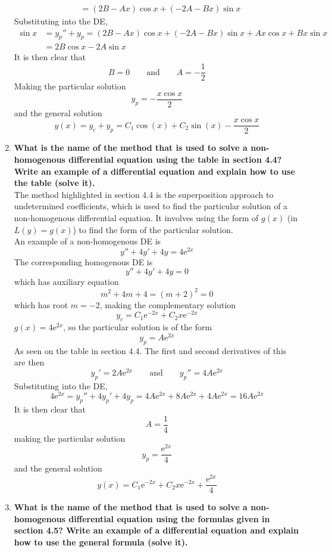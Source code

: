 \documentclass[12pt]{article}
\newcommand{\en}{\text{e}}
\begin{document}
\begin{enumerate}
\begin{align*}
						&= (2B - Ax)\cos x + (-2A - Bx)\sin x
				\end{align*}
				Substituting into the DE,
				\begin{align*}
					\sin x &= y_p'' + y_p
							= (2B - Ax)\cos x + (-2A - Bx)\sin x  + Ax\cos x + Bx \sin x \\
						&= 2B\cos x - 2A\sin x
				\end{align*}
				It is then clear that
				\[
					B = 0 \qquad \text{and} \qquad
						A = -\frac{1}{2}
				\]
				Making the particular solution
				\[y_p = -\frac{x\cos x}{2}\]
				and the general solution
				\[
					y(x) = y_c + y_p
						= C_1\cos(x) + C_2\sin(x) - \frac{x\cos x}{2}
				\]
		\item \textbf{What is the name of the method that is used to solve a non-homogenous differential equation using the table in section 4.4? Write an example of a differential equation and explain how to use the table (solve it).} \\
			The method highlighted in section 4.4 is the superposition approach to undetermined coefficients, which is used to find the particular solution of a non-homogenous differential equation. It involves using the form of \(g(x)\) (in \(L(y) = g(x)\)) to find the form of the particular solution. \\
			An example of a non-homogenous DE is
				\[y'' + 4y' + 4y = 4\en^{2x}\]
				The corresponding homogenous DE is
				\[y'' + 4y' + 4y = 0\]
				which has auxiliary equation 
				\[m^2 + 4m + 4 = (m + 2)^2 = 0\]
				which has root \(m = -2\), making the complementary solution
				\[y_c = C_1\en^{-2 x} + C_2x\en^{-2 x}\]
				\(g(x) = 4\en^{2x}\), so the particular solution is of the form
				\[y_p = A\en^{2x}\]
				As seen on the table in section 4.4. The first and second derivatives of this are then
				\[
					y_p' = 2A\en^{2x} \qquad \text{and} \qquad
					y_p'' = 4A\en^{2x}
				\]
				Substituting into the DE,
				\[
					4\en^{2x} = y_p'' + 4y_p' + 4y_p
						= 4A\en^{2x} + 8A\en^{2x} + 4A\en^{2x}
						= 16A\en^{2x}
				\]
				It is then clear that
				\[A = \frac{1}{4}\]
				making the particular solution
				\[y_p = \frac{\en^{2x}}{4}\]
				and the general solution
				\[y(x) = C_1\en^{-2x} + C_2x\en^{-2x} + \frac{\en^{2x}}{4}\]
		\item \textbf{What is the name of the method that is used to solve a non-homogenous differential equation using the formulas given in section 4.5? Write an example of a differential equation and explain how to use the general formula (solve it).} \\

\end{enumerate}
\end{document}
